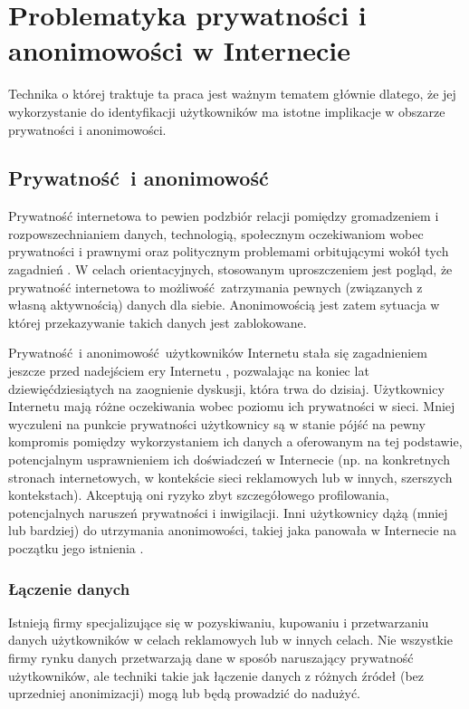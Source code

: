 \chapter{Problematyka prywatności i anonimowości w Internecie}
Technika o której traktuje ta praca jest ważnym tematem głównie dlatego, że jej
wykorzystanie do identyfikacji użytkowników ma istotne implikacje w obszarze
prywatności i anonimowości.

\section{Prywatność i anonimowość}
Prywatność internetowa to pewien podzbiór relacji pomiędzy gromadzeniem i
rozpowszechnianiem danych, technologią, społecznym oczekiwaniom wobec
prywatności i prawnymi oraz politycznym problemami orbitującymi wokół tych
zagadnień \cite{michael2014uberveillance}. W celach orientacyjnych, stosowanym
uproszczeniem jest pogląd, że prywatność internetowa to możliwość zatrzymania
pewnych (związanych z własną aktywnością) danych dla siebie. Anonimowością jest
zatem sytuacja w której przekazywanie takich danych jest zablokowane.

Prywatność i anonimowość użytkowników Internetu stała się zagadnieniem jeszcze
przed nadejściem ery Internetu \cite{david1965some}, pozwalając na koniec lat
dziewięćdziesiątych na zaognienie dyskusji, która trwa do dzisiaj. Użytkownicy
Internetu mają różne oczekiwania wobec poziomu ich prywatności w sieci. Mniej
wyczuleni na punkcie prywatności użytkownicy są w stanie pójść na pewny
kompromis pomiędzy wykorzystaniem ich danych a oferowanym na tej podstawie,
potencjalnym usprawnieniem ich doświadczeń w Internecie (np. na konkretnych
stronach internetowych, w kontekście sieci reklamowych lub w innych, szerszych
kontekstach). Akceptują oni ryzyko zbyt szczegółowego profilowania,
potencjalnych naruszeń prywatności i inwigilacji. Inni użytkownicy dążą (mniej
lub bardziej) do utrzymania anonimowości, takiej jaka panowała w Internecie na
początku jego istnienia \cite[s. 54--69]{snowden2019pamiec}.

\subsection{Łączenie danych}
Istnieją firmy specjalizujące się w pozyskiwaniu, kupowaniu i przetwarzaniu
danych użytkowników w celach reklamowych lub w innych celach. Nie wszystkie
firmy rynku danych przetwarzają dane w sposób naruszający prywatność
użytkowników, ale techniki takie jak łączenie danych z różnych źródeł (bez
uprzedniej anonimizacji) mogą lub będą prowadzić do nadużyć.

